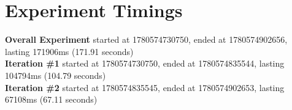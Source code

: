 \documentclass{article}
\begin{document}
\section*{Experiment Timings}
\textbf{Overall Experiment} started at 1780574730750, ended at 1780574902656, lasting 171906ms (171.91 seconds)
\\\textbf{Iteration \#1} started at 1780574730750, ended at 1780574835544, lasting 104794ms (104.79 seconds)
\\\textbf{Iteration \#2} started at 1780574835545, ended at 1780574902653, lasting 67108ms (67.11 seconds)
\end{document}
